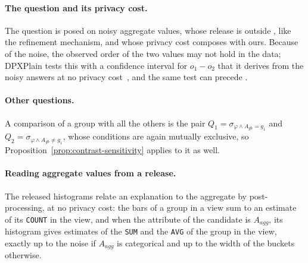 \paragraph{The question and its privacy cost.}
The question is posed on noisy aggregate values, whose release is outside \sys{}, like the refinement mechanism, and whose privacy cost composes with ours.
Because of the noise, the observed order of the two values may not hold in the data; DPXPlain tests this with a confidence interval for $o_1-o_2$ that it derives from the noisy answers at no privacy cost~\cite{TaoGMR22}, and the same test can precede \sys{}.

\paragraph{Other questions.}
A comparison of a group with all the others is the pair $Q_1=\sigma_{\varphi\wedge A_{gb}=g_1}$ and $Q_2=\sigma_{\varphi\wedge A_{gb}\neq g_1}$, whose conditions are again mutually exclusive, so Proposition~\ref{prop:contrast-sensitivity} applies to it as well.

\paragraph{Reading aggregate values from a release.}
The released histograms relate an explanation to the aggregate by post-processing, at no privacy cost: the bars of a group in a view sum to an estimate of its \texttt{COUNT} in the view, and when the attribute of the candidate is $A_{agg}$, its histogram gives estimates of the \texttt{SUM} and the \texttt{AVG} of the group in the view, exactly up to the noise if $A_{agg}$ is categorical and up to the width of the buckets otherwise.

